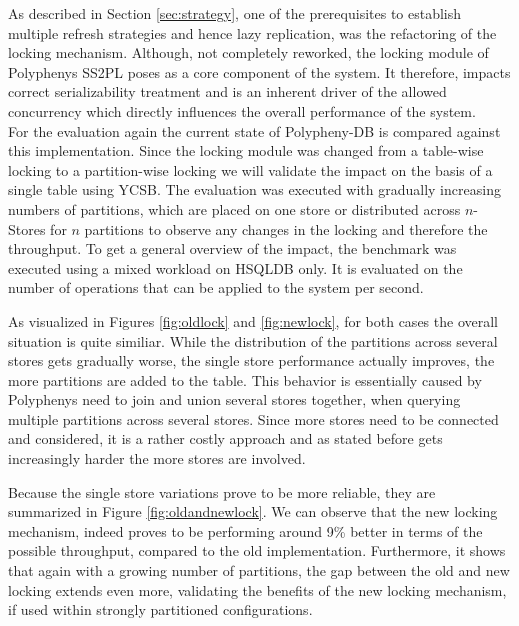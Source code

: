 As described in Section \ref{sec:strategy}, one of the prerequisites to establish multiple refresh strategies and hence lazy replication,  
was the refactoring of the locking mechanism. Although, not completely reworked, the locking module of Polyphenys SS2PL 
poses as a core component of the system. It therefore, impacts correct serializability treatment and is an inherent driver of 
the allowed concurrency which directly influences the overall performance of the system.\\
For the evaluation again the current state of Polypheny-DB is compared against this implementation.
Since the locking module was changed from a table-wise locking to a partition-wise locking we will validate the impact on the basis of 
a single table using YCSB. 
The evaluation was executed with gradually increasing numbers of partitions, which are placed on one store or distributed across $n$-Stores 
for $n$ partitions to observe any changes in the locking and therefore the throughput.
To get a general overview of the impact, the benchmark was executed using a mixed workload on HSQLDB only.
It is evaluated on the number of operations that can be applied to the system per second.




As visualized in Figures \ref{fig:oldlock} and \ref{fig:newlock}, for both cases the overall situation is quite similiar.
While the distribution of the partitions across several stores gets gradually worse, the single store performance actually improves, the more partitions are added to the table.
This behavior is essentially caused by Polyphenys need to join and union several stores together, when querying multiple partitions across several stores.
Since more stores need to be connected and considered, it is a rather costly approach and as stated before gets increasingly harder the more stores are involved.

Because the single store variations prove to be more reliable, they are summarized in Figure \ref{fig:oldandnewlock}.
We can observe that the new locking mechanism, indeed proves to be performing around 9\% better in terms of the possible throughput, compared to the old implementation.
Furthermore, it shows that again with a growing number of partitions, the gap between the old and new locking extends even more, 
validating the benefits of the new locking mechanism, if used within strongly partitioned configurations.






